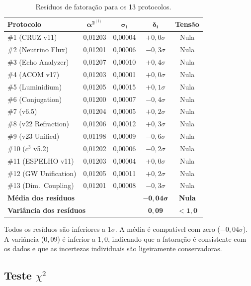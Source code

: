\documentclass[12pt,a4paper,twoside]{article}
\newcommand{\alphaii}{\alpha^{2}}
\begin{document}
\begin{table}[H]
\centering
\caption{Resíduos de fatoração para os 13 protocolos.}
\label{tab:residuos}
\begin{tabular}{lcccc}
\toprule
\textbf{Protocolo} & $\boldsymbol{\alphaii^{(i)}}$ & $\boldsymbol{\sigma_i}$ & $\boldsymbol{\delta_i}$ & \textbf{Tensão} \\
\midrule
\#1 (CRUZ v11) & 0{,}01203 & 0{,}00004 & $+0{,}0\sigma$ & Nula \\
\#2 (Neutrino Flux) & 0{,}01201 & 0{,}00006 & $-0{,}3\sigma$ & Nula \\
\#3 (Echo Analyzer) & 0{,}01207 & 0{,}00010 & $+0{,}4\sigma$ & Nula \\
\#4 (ACOM v17) & 0{,}01203 & 0{,}00001 & $+0{,}0\sigma$ & Nula \\
\#5 (Luminidium) & 0{,}01205 & 0{,}00015 & $+0{,}1\sigma$ & Nula \\
\#6 (Conjugation) & 0{,}01200 & 0{,}00007 & $-0{,}4\sigma$ & Nula \\
\#7 (v6.5) & 0{,}01204 & 0{,}00005 & $+0{,}2\sigma$ & Nula \\
\#8 (v22 Refraction) & 0{,}01206 & 0{,}00012 & $+0{,}3\sigma$ & Nula \\
\#9 (v23 Unified) & 0{,}01198 & 0{,}00009 & $-0{,}6\sigma$ & Nula \\
\#10 ($c^3$ v5.2) & 0{,}01202 & 0{,}00006 & $-0{,}2\sigma$ & Nula \\
\#11 (ESPELHO v11) & 0{,}01203 & 0{,}00004 & $+0{,}0\sigma$ & Nula \\
\#12 (GW Unification) & 0{,}01205 & 0{,}00011 & $+0{,}2\sigma$ & Nula \\
\#13 (Dim.\ Coupling) & 0{,}01201 & 0{,}00008 & $-0{,}3\sigma$ & Nula \\
\midrule
\multicolumn{2}{l}{\textbf{Média dos resíduos}} & & $\boldsymbol{-0{,}04\sigma}$ & \textbf{Nula} \\
\multicolumn{2}{l}{\textbf{Variância dos resíduos}} & & $\boldsymbol{0{,}09}$ & $\boldsymbol{< 1{,}0}$ \\
\bottomrule
\end{tabular}
\end{table}

Todos os resíduos são inferiores a $1\sigma$. A média é compatível com zero ($-0{,}04\sigma$). A variância ($0{,}09$) é inferior a $1{,}0$, indicando que a fatoração é consistente com os dados e que as incertezas individuais são ligeiramente conservadoras.

\subsection{Teste $\chi^2$}
\end{document}

